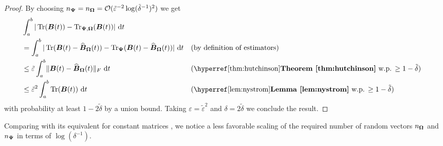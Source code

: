 \begin{proof}
    By choosing $n_{\boldsymbol{\Psi}} = n_{\boldsymbol{\Omega}} = \mathcal{O}(\tilde{\varepsilon}^{-2} \log(\tilde{\delta}^{-1})^2)$ we get
    \begin{align}
        &\int_{a}^{b} | \Trace(\mtx{B}(t)) - \Nystrpp{\mtx{\Omega}}{\mtx{\Psi}}(\mtx{B}(t)) |~\mathrm{d}t \notag \\
        &= \int_{a}^{b} | \Trace(\mtx{B}(t) - \Nystr{\mtx{\Omega}}{\mtx{B}}(t)) - \Hutch{\mtx{\Psi}}(\mtx{B}(t) - \Nystr{\mtx{\Omega}}{\mtx{B}}(t)) |~\mathrm{d}t && \text{(by definition of estimators)} \notag \\
        &\leq \tilde{\varepsilon} \int_{a}^{b} \lVert \mtx{B}(t) - \Nystr{\mtx{\Omega}}{\mtx{B}}(t) \rVert _F ~\mathrm{d}t && \text{(\refthm{thm:hutchinson} w.p. $\geq 1 - \tilde{\delta}$)} \notag \\
        &\leq \tilde{\varepsilon}^2 \int_{a}^{b} \Trace(\mtx{B}(t)) ~\mathrm{d}t && \text{(\reflem{lem:nystrom} w.p. $\geq 1 - \tilde{\delta}$)} 
    \end{align}
    with probability at least $1 - 2\tilde{\delta}$ by a union bound. Taking $\varepsilon = \tilde{\varepsilon}^2$ and $\delta = 2 \tilde{\delta}$ we conclude the result.

\end{proof}

Comparing  with its equivalent for constant matrices \cite[Theorem 3.4]{persson-2022-improved-variants}, we notice a less favorable scaling of the required number of random vectors $n_{\boldsymbol{\Omega}}$ and $n_{\boldsymbol{\Psi}}$ in terms of $\log(\delta^{-1})$.

